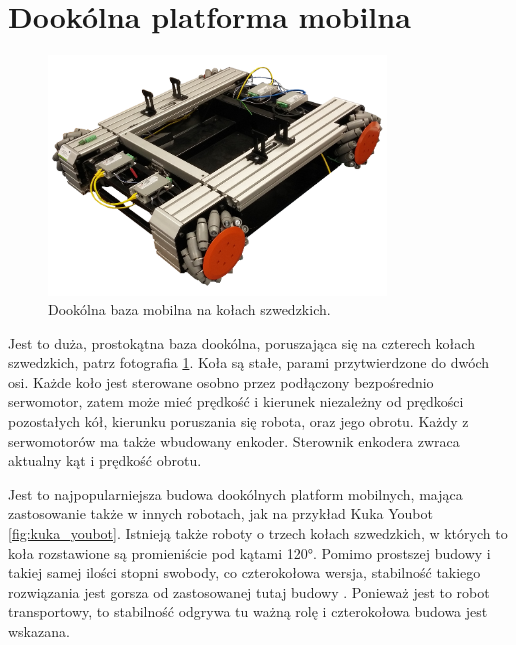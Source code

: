 \section{Dookólna platforma mobilna}
	\begin{figure}[H]
	\centering
	\includegraphics[width=0.8\textwidth]{graphics/base_photo.png}
	\caption{Dookólna baza mobilna na kołach szwedzkich.}
	\label{fig:base_photo}
	\end{figure} 

	Jest to duża, prostokątna baza dookólna, poruszająca się na czterech kołach szwedzkich, patrz fotografia \ref{fig:base_photo}.
	Koła są stałe, parami przytwierdzone do dwóch osi.
	Każde koło jest sterowane osobno przez podłączony bezpośrednio serwomotor, 
	zatem może mieć prędkość i kierunek niezależny od prędkości pozostałych kół, kierunku poruszania się robota, oraz jego obrotu.
	Każdy z serwomotorów ma także wbudowany enkoder.
	Sterownik enkodera zwraca aktualny kąt i prędkość obrotu.

	Jest to najpopularniejsza budowa dookólnych platform mobilnych, mająca zastosowanie także w innych robotach, jak na przykład Kuka Youbot \ref{fig:kuka_youbot}.
	Istnieją także roboty o trzech kołach szwedzkich, w których to koła rozstawione są promieniście pod kątami 120°.
	Pomimo prostszej budowy i takiej samej ilości stopni swobody, co czterokołowa wersja, stabilność takiego rozwiązania jest gorsza od zastosowanej tutaj budowy \cite{extra_axis}.
	Ponieważ jest to robot transportowy, to stabilność odgrywa tu ważną rolę i czterokołowa budowa jest wskazana.

